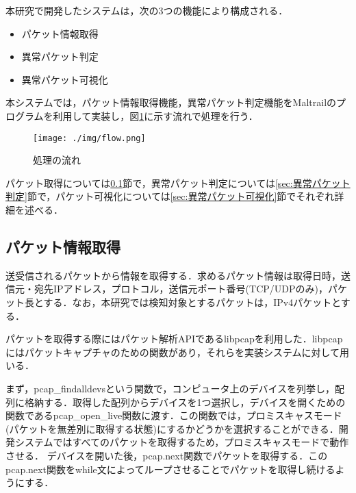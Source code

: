 \documentclass{thesis}
\begin{document}
本研究で開発したシステムは，次の3つの機能により構成される．

\begin{itemize}
\item パケット情報取得
\item 異常パケット判定
\item 異常パケット可視化
\end{itemize}


本システムでは，パケット情報取得機能，異常パケット判定機能をMaltrailのプログラムを利用して実装し，図\ref{fig:flow}に示す流れで処理を行う．



\begin{figure}[H]
  \centering
  \texttt{[image: ./img/flow.png]}
  \caption{処理の流れ}
  \label{fig:flow}
\end{figure}



パケット取得については\ref{sec:パケット情報取得}節で，異常パケット判定については\ref{sec:異常パケット判定}節で，パケット可視化については\ref{sec:異常パケット可視化}節でそれぞれ詳細を述べる．

\subsection{パケット情報取得} \label{sec:パケット情報取得}

送受信されるパケットから情報を取得する．求めるパケット情報は取得日時，送信元・宛先IPアドレス，プロトコル，送信元ポート番号(TCP/UDPのみ)，パケット長とする．なお，本研究では検知対象とするパケットは，IPv4パケットとする．

パケットを取得する際にはパケット解析APIであるlibpcap\cite{tcpdump}を利用した．libpcapにはパケットキャプチャのための関数があり，それらを実装システムに対して用いる．

まず，pcap\_findalldevsという関数で，コンピュータ上のデバイスを列挙し，配列に格納する．取得した配列からデバイスを1つ選択し，デバイスを開くための関数であるpcap\_open\_live関数に渡す．この関数では，プロミスキャスモード(パケットを無差別に取得する状態)にするかどうかを選択することができる．開発システムではすべてのパケットを取得するため，プロミスキャスモードで動作させる．
デバイスを開いた後，pcap.next関数でパケットを取得する．このpcap.next関数をwhile文によってループさせることでパケットを取得し続けるようにする．
\end{document}
